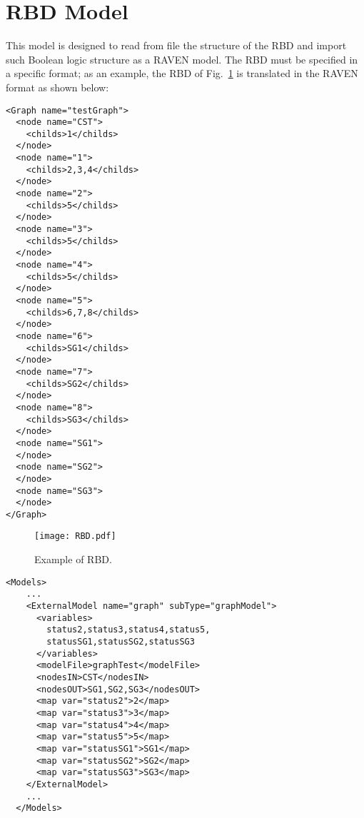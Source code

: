 \section{RBD Model}
\label{sec:RBDmodel}

This model is designed to read from file the structure of the RBD and import such Boolean logic structure as a RAVEN model.
The RBD must be specified in a specific format; as an example, the RBD of Fig.~\ref{fig:RBD} is translated in the RAVEN format as shown below:

\begin{lstlisting}[style=XML,morekeywords={anAttribute},caption=RBD model input example., label=lst:RBDmodel]
<Graph name="testGraph">
  <node name="CST">
    <childs>1</childs>
  </node>
  <node name="1">
    <childs>2,3,4</childs>
  </node>
  <node name="2">
    <childs>5</childs>
  </node>
  <node name="3">
    <childs>5</childs>
  </node>
  <node name="4">
    <childs>5</childs>
  </node>
  <node name="5">
    <childs>6,7,8</childs>
  </node>
  <node name="6">
    <childs>SG1</childs>
  </node>
  <node name="7">
    <childs>SG2</childs>
  </node>
  <node name="8">
    <childs>SG3</childs>
  </node>
  <node name="SG1">
  </node>
  <node name="SG2">
  </node>
  <node name="SG3">
  </node>
</Graph>
\end{lstlisting} 

\begin{figure}
    \centering
    \centerline{\texttt{[image: RBD.pdf]}} 
    \caption{Example of RBD.}
    \label{fig:RBD}
\end{figure}

\begin{lstlisting}[style=XML,morekeywords={anAttribute},caption=RBD model input example., label=lst:RBD_InputExample]
  <Models> 
    ...
    <ExternalModel name="graph" subType="graphModel">
      <variables>
        status2,status3,status4,status5,
        statusSG1,statusSG2,statusSG3
      </variables>
      <modelFile>graphTest</modelFile>
      <nodesIN>CST</nodesIN>
      <nodesOUT>SG1,SG2,SG3</nodesOUT>
      <map var="status2">2</map>
      <map var="status3">3</map>
      <map var="status4">4</map>
      <map var="status5">5</map>
      <map var="statusSG1">SG1</map>
      <map var="statusSG2">SG2</map>
      <map var="statusSG3">SG3</map>
    </ExternalModel>
    ...
  </Models>
\end{lstlisting}


